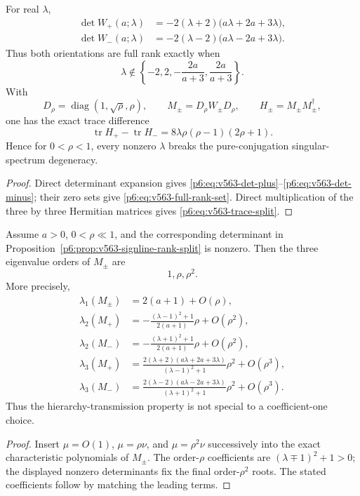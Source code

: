 \documentclass[11pt,a4paper]{article}
\begin{document}
\begin{proposition}
\label{p6:prop:v563-signline-rank-split}
For real \(\lambda\),
\begin{align}
 \det W_+(a;\lambda)
 &=-2(\lambda+2)\bigl(a\lambda+2a+3\lambda\bigr),
 \label{p6:eq:v563-det-plus}\\
 \det W_-(a;\lambda)
 &=-2(\lambda-2)\bigl(a\lambda-2a+3\lambda\bigr).
 \label{p6:eq:v563-det-minus}
\end{align}
Thus both orientations are full rank exactly when
\begin{equation}
\label{p6:eq:v563-full-rank-set}
 \lambda\notin
 \left\{-2,2,-\frac{2a}{a+3},\frac{2a}{a+3}\right\}.
\end{equation}
With
\[
 D_\rho=\operatorname{diag}(1,\sqrt\rho,\rho),
 \qquad M_\pm=D_\rho W_\pm D_\rho,
 \qquad H_\pm=M_\pm M_\pm^\dagger,
\]
one has the exact trace difference
\begin{equation}
\label{p6:eq:v563-trace-split}
 \boxed{
 \operatorname{tr}H_+-\operatorname{tr}H_-
 =8\lambda\rho(\rho-1)(2\rho+1).}
\end{equation}
Hence for \(0<\rho<1\), every nonzero \(\lambda\) breaks the
pure-conjugation singular-spectrum degeneracy.
\end{proposition}
\begin{proof}
Direct determinant expansion gives
\eqref{p6:eq:v563-det-plus}--\eqref{p6:eq:v563-det-minus}; their zero sets
give \eqref{p6:eq:v563-full-rank-set}.  Direct multiplication of the three by
three Hermitian matrices gives \eqref{p6:eq:v563-trace-split}.
\end{proof}

\begin{proposition}
\label{p6:prop:v563-signline-hierarchy-orders}
Assume \(a>0\), \(0<\rho\ll1\), and the corresponding determinant in
Proposition~\ref{p6:prop:v563-signline-rank-split} is nonzero.  Then the three
eigenvalue orders of \(M_\pm\) are
\[
 \boxed{1,\rho,\rho^2}.
\]
More precisely,
\begin{align*}
 \lambda_1(M_\pm)&=2(a+1)+O(\rho),\\
 \lambda_2(M_+)&=-\frac{(\lambda-1)^2+1}{2(a+1)}\rho+O(\rho^2),\\
 \lambda_2(M_-)&=-\frac{(\lambda+1)^2+1}{2(a+1)}\rho+O(\rho^2),\\
 \lambda_3(M_+)&=
 \frac{2(\lambda+2)(a\lambda+2a+3\lambda)}{(\lambda-1)^2+1}
 \rho^2+O(\rho^3),\\
 \lambda_3(M_-)&=
 \frac{2(\lambda-2)(a\lambda-2a+3\lambda)}{(\lambda+1)^2+1}
 \rho^2+O(\rho^3).
\end{align*}
Thus the hierarchy-transmission property is not special to a coefficient-one
choice.
\end{proposition}
\begin{proof}
Insert \(\mu=O(1)\), \(\mu=\rho\nu\), and
\(\mu=\rho^2\nu\) successively into the exact characteristic polynomials of
\(M_\pm\).  The order-\(\rho\) coefficients are
\((\lambda\mp1)^2+1>0\); the displayed nonzero determinants fix the final
order-\(\rho^2\) roots.  The stated coefficients follow by matching the
leading terms.
\end{proof}
\end{document}
